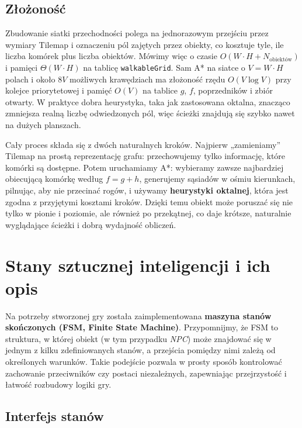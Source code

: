 \documentclass[a4paper,12pt]{book} %
\begin{document}
\subsection*{Złożoność}

Zbudowanie siatki przechodności polega na jednorazowym przejściu przez wymiary Tilemap i oznaczeniu pól zajętych przez obiekty, co kosztuje tyle, ile liczba komórek plus liczba obiektów. Mówimy więc o czasie \(O(W\cdot H + N_{\text{obiektów}})\) i pamięci \(\Theta(W\cdot H)\) na tablicę \texttt{walkableGrid}. Sam A* na siatce o \(V=W\cdot H\) polach i około \(8V\) możliwych krawędziach ma złożoność rzędu \(O(V\log V)\) przy kolejce priorytetowej i pamięć \(O(V)\) na tablice \(g\), \(f\), poprzedników i zbiór otwarty. W praktyce dobra heurystyka, taka jak zastosowana oktalna, znacząco zmniejsza realną liczbę odwiedzonych pól, więc ścieżki znajdują się szybko nawet na dużych planszach.



Cały proces składa się z dwóch naturalnych kroków. Najpierw „zamieniamy” Tilemap na prostą reprezentację grafu: przechowujemy tylko informację, które komórki są dostępne. Potem uruchamiamy A*: wybieramy zawsze najbardziej obiecującą komórkę według \(f=g+h\), generujemy sąsiadów w ośmiu kierunkach, pilnując, aby nie przecinać rogów, i używamy \textbf{heurystyki oktalnej}, która jest zgodna z przyjętymi kosztami kroków. Dzięki temu obiekt może poruszać się nie tylko w pionie i poziomie, ale również po przekątnej, co daje krótsze, naturalnie wyglądające ścieżki i dobrą wydajność obliczeń.

\section{Stany sztucznej inteligencji i ich opis}

Na potrzeby stworzonej gry została zaimplementowana \textbf{maszyna stanów skończonych (FSM, Finite State Machine)}.  
Przypomnijmy, że FSM to struktura, w której obiekt (w tym przypadku \textit{NPC}) może znajdować się w jednym z kilku zdefiniowanych stanów, a przejścia pomiędzy nimi zależą od określonych warunków.  
Takie podejście pozwala w prosty sposób kontrolować zachowanie przeciwników czy postaci niezależnych, zapewniając przejrzystość i łatwość rozbudowy logiki gry.

\subsection*{Interfejs stanów}
\end{document}

